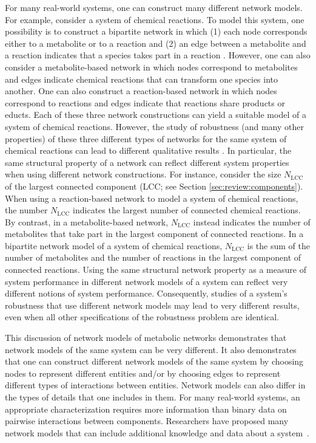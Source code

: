 \documentclass{comnet-mod}
\begin{document}
For many real-world systems, one can construct many different network models. For example, consider a system of chemical reactions. To model this system, one possibility is to construct a bipartite network in which (1) each node corresponds either to a metabolite or to a reaction and (2) an edge between a metabolite and a reaction indicates that a species takes part in a reaction \cite{Winterbach2011}. However, one can also consider a metabolite-based network in which nodes correspond to metabolites and edges indicate chemical reactions that can transform one species into another. One can also construct a reaction-based network in which nodes correspond to reactions and edges indicate that reactions share products or educts. Each of these three network constructions can yield a suitable model of a system of chemical reactions. However, the study of robustness (and many other properties) of these three different types of networks for the same system of chemical reactions can lead to different qualitative results \cite{Larhlimi2011, Winterbach2011}. In particular, the same structural property of a network can reflect different system properties when using different network constructions. For instance, consider the size $N_{\textrm{LCC}}$ of the largest connected component (LCC; see Section \ref{sec:review:components}). When using a reaction-based network to model a system of chemical reactions, the number $N_{\textrm{LCC}}$ indicates the largest number of connected chemical reactions. By contrast, in a metabolite-based network, $N_{\textrm{LCC}}$ instead indicates the number of metabolites that take part in the largest component of connected reactions. In a bipartite network model of a system of chemical reactions, $N_{\textrm{LCC}}$ is the sum of the number of metabolites and the number of reactions in the largest component of connected reactions. Using the same structural network property as a measure of system performance in different network models of a system can reflect very different notions of system performance. Consequently, studies of a system's robustness that use different network models may lead to very different results, even when all other specifications of the robustness problem are identical.

This discussion of network models of metabolic networks demonstrates that network models of the same system can be very different. It also demonstrates that one can construct different network models of the same system by choosing nodes to represent different entities and/or by choosing edges to represent different types of interactions between entities. Network models can also differ in the types of details that one includes in them. For many real-world systems, an appropriate characterization requires more information than binary data on pairwise interactions between components. Researchers have proposed many network models that can include additional knowledge and data about a system~\cite{Porter2020, Bick2023}.
\end{document}
